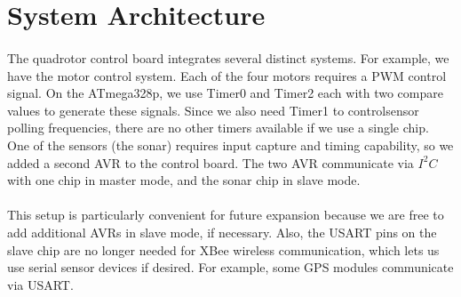 \section{System Architecture}
\paragraph{}
The quadrotor control board integrates several distinct systems. For example, we have the motor control system.  Each of the four motors requires a PWM control signal.  On the ATmega328p, we use Timer0 and Timer2 each with two compare values to generate these signals.  Since we also need Timer1 to controlsensor polling frequencies, there are no other timers available if we use a single chip.  One of the sensors (the sonar) requires input capture and timing capability, so we added a second AVR to the control board.  The two AVR communicate via $I^2C$ with one chip in master mode, and the sonar chip in slave mode.
\paragraph{}
This setup is particularly convenient for future expansion because we are free to add additional AVRs in slave mode, if necessary.  Also, the USART pins on the slave chip are no longer needed for XBee wireless communication, which lets us use serial sensor devices if desired.  For example, some GPS modules communicate via USART.

